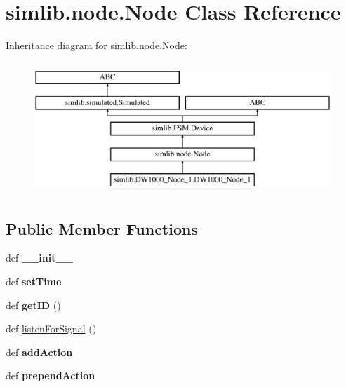 \hypertarget{classsimlib_1_1node_1_1_node}{}\section{simlib.\+node.\+Node Class Reference}
\label{classsimlib_1_1node_1_1_node}
Inheritance diagram for simlib.\+node.\+Node\+:\begin{figure}[H]
\begin{center}
\leavevmode
\includegraphics[height=5.000000cm]{classsimlib_1_1node_1_1_node}
\end{center}
\end{figure}
\subsection*{Public Member Functions}
\begin{DoxyCompactItemize}
\item 
\mbox{\label{classsimlib_1_1node_1_1_node_ac6ef99e7e1c00c83ab001912a3d877b3}} 
def {\bfseries \+\_\+\+\_\+init\+\_\+\+\_\+}
\item 
\mbox{\label{classsimlib_1_1node_1_1_node_a974a9b9f6f25605316255eb0e66e9f56}} 
def {\bfseries set\+Time}
\item 
\mbox{\label{classsimlib_1_1node_1_1_node_a0bacc9e18647d14375eb93c26745d83c}} 
def {\bfseries get\+ID} ()
\item 
def \mbox{\hyperlink{classsimlib_1_1node_1_1_node_aa1c426997905e0825fdd529fe07f5538}{listen\+For\+Signal}} ()
\item 
\mbox{\label{classsimlib_1_1node_1_1_node_a8c20a00c9d19ea5762c1388eaf232737}} 
def {\bfseries add\+Action}
\item 
\mbox{\label{classsimlib_1_1node_1_1_node_a6ddb478f68f40125776533ea5c4f03b0}} 
def {\bfseries prepend\+Action}
\end{DoxyCompactItemize}
